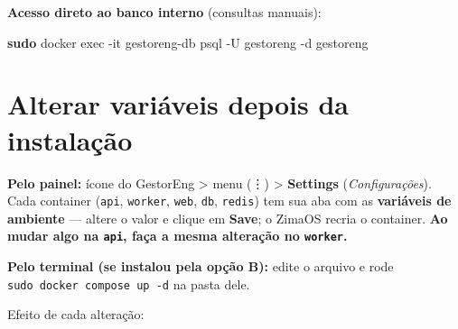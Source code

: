 \documentclass[
  10pt,
]{article}
\newenvironment{Shaded}{\begin{snugshade}}{\end{snugshade}}
\newcommand{\AttributeTok}[1]{\textcolor[rgb]{0.13,0.29,0.53}{#1}}
\newcommand{\FunctionTok}[1]{\textcolor[rgb]{0.13,0.29,0.53}{\textbf{#1}}}
\newcommand{\NormalTok}[1]{#1}
\begin{document}
\textbf{Acesso direto ao banco interno} (consultas manuais):

\begin{Shaded}
\begin{Highlighting}[]
\FunctionTok{sudo}\NormalTok{ docker exec }\AttributeTok{{-}it}\NormalTok{ gestoreng{-}db psql }\AttributeTok{{-}U}\NormalTok{ gestoreng }\AttributeTok{{-}d}\NormalTok{ gestoreng}
\end{Highlighting}
\end{Shaded}

\hypertarget{alterar-variuxe1veis-depois-da-instalauxe7uxe3o}{%
\section{Alterar variáveis depois da
instalação}\label{alterar-variuxe1veis-depois-da-instalauxe7uxe3o}}

\textbf{Pelo painel:} ícone do GestorEng \textgreater{} menu (⋮)
\textgreater{} \textbf{Settings} (\emph{Configurações}). Cada container
(\texttt{api}, \texttt{worker}, \texttt{web}, \texttt{db},
\texttt{redis}) tem sua aba com as \textbf{variáveis de ambiente} ---
altere o valor e clique em \textbf{Save}; o ZimaOS recria o container.
\textbf{Ao mudar algo na \texttt{api}, faça a mesma alteração no
\texttt{worker}.}

\textbf{Pelo terminal (se instalou pela opção B):} edite o arquivo e
rode \texttt{sudo\ docker\ compose\ up\ -d} na pasta dele.

Efeito de cada alteração:
\end{document}
